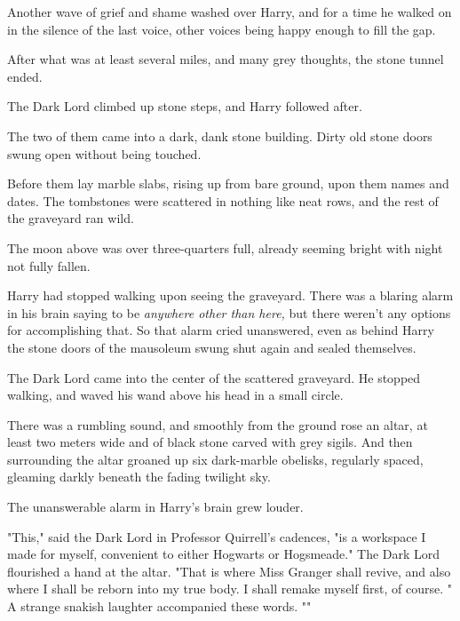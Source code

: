 Another wave of grief and shame washed over Harry, and for a time he walked on
in the silence of the last voice, other voices being happy enough to fill the
gap.

After what was at least several miles, and many grey thoughts, the stone tunnel
ended.

The Dark Lord climbed up stone steps, and Harry followed after.

The two of them came into a dark, dank stone building. Dirty old stone doors
swung open without being touched.

Before them lay marble slabs, rising up from bare ground, upon them names and
dates. The tombstones were scattered in nothing like neat rows, and the rest of
the graveyard ran wild.

The moon above was over three-quarters full, already seeming bright with night
not fully fallen.

Harry had stopped walking upon seeing the graveyard. There was a blaring alarm
in his brain saying to be \emph{anywhere other than here,} but there weren't
any options for accomplishing that. So that alarm cried unanswered, even as
behind Harry the stone doors of the mausoleum swung shut again and sealed
themselves.

The Dark Lord came into the center of the scattered graveyard. He stopped
walking, and waved his wand above his head in a small circle.

There was a rumbling sound, and smoothly from the ground rose an altar, at
least two meters wide and of black stone carved with grey sigils. And then
surrounding the altar groaned up six dark-marble obelisks, regularly spaced,
gleaming darkly beneath the fading twilight sky.

The unanswerable alarm in Harry's brain grew louder.

"This," said the Dark Lord in Professor Quirrell's cadences, "is a workspace I
made for myself, convenient to either Hogwarts or Hogsmeade." The Dark Lord
flourished a hand at the altar. "That is where Miss Granger shall revive, and
also where I shall be reborn into my true body. I shall remake myself first, of
course. " A strange
snakish laughter accompanied these words. ""

